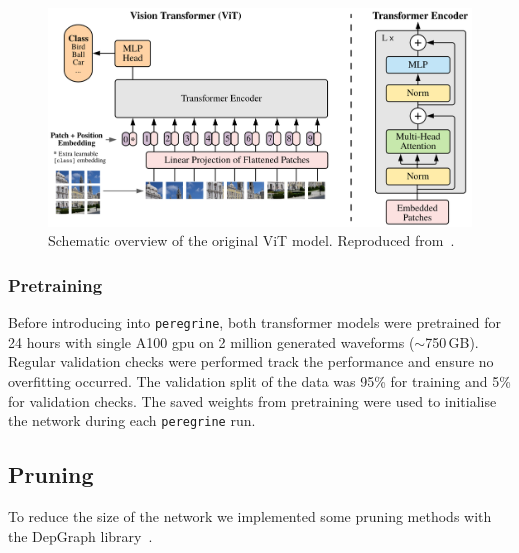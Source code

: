 \begin{figure}[htb]
  \centering
  \includegraphics[width=1\linewidth]{media/images/ViTmodel.PNG}
  \caption{Schematic overview of the original ViT model. Reproduced from~\cite{Vaswani_2017_transformer}.}
  \label{fig:vit_model_architecure}
\end{figure}

\subsubsection{Pretraining}

Before introducing into \texttt{peregrine}, both transformer models were pretrained for 24 hours with single A100 gpu on 2 million generated waveforms ($\sim$750\,GB). Regular validation checks were performed track the performance and ensure no overfitting occurred. The validation split of the data was 95\% for training and 5\% for validation checks. The saved weights from pretraining were used to initialise the network during each \texttt{peregrine} run. 

\subsection{Pruning}

To reduce the size of the network we implemented some pruning methods with the DepGraph library~\cite{Fang_Ma_Song_Mi_Wang_2023}.


